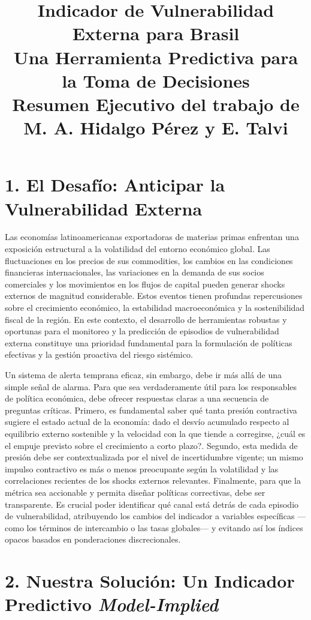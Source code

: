 \documentclass[11pt,a4paper]{article}
\title{
    \vspace{1cm}
    \LARGE{\textbf{Indicador de Vulnerabilidad Externa para Brasil}} \\
    \large{Una Herramienta Predictiva para la Toma de Decisiones} \\
    \vspace{0.5cm}
    \normalsize{Resumen Ejecutivo del trabajo de M. A. Hidalgo Pérez y E. Talvi}
}
\begin{document}
\section*{1. El Desafío: Anticipar la Vulnerabilidad Externa}

Las economías latinoamericanas exportadoras de materias primas enfrentan una exposición estructural a la volatilidad del entorno económico global. Las fluctuaciones en los precios de sus commodities, los cambios en las condiciones financieras internacionales, las variaciones en la demanda de sus socios comerciales y los movimientos en los flujos de capital pueden generar shocks externos de magnitud considerable. Estos eventos tienen profundas repercusiones sobre el crecimiento económico, la estabilidad macroeconómica y la sostenibilidad fiscal de la región. En este contexto, el desarrollo de herramientas robustas y oportunas para el monitoreo y la predicción de episodios de vulnerabilidad externa constituye una prioridad fundamental para la formulación de políticas efectivas y la gestión proactiva del riesgo sistémico.

Un sistema de alerta temprana eficaz, sin embargo, debe ir más allá de una simple señal de alarma. Para que sea verdaderamente útil para los responsables de política económica, debe ofrecer respuestas claras a una secuencia de preguntas críticas. Primero, es fundamental saber qué tanta presión contractiva sugiere el estado actual de la economía: dado el desvío acumulado respecto al equilibrio externo sostenible y la velocidad con la que tiende a corregirse, ¿cuál es el empuje previsto sobre el crecimiento a corto plazo?. Segundo, esta medida de presión debe ser contextualizada por el nivel de incertidumbre vigente; un mismo impulso contractivo es más o menos preocupante según la volatilidad y las correlaciones recientes de los shocks externos relevantes. Finalmente, para que la métrica sea accionable y permita diseñar políticas correctivas, debe ser transparente. Es crucial poder identificar qué canal está detrás de cada episodio de vulnerabilidad, atribuyendo los cambios del indicador a variables específicas —como los términos de intercambio o las tasas globales— y evitando así los índices opacos basados en ponderaciones discrecionales.


\section*{2. Nuestra Solución: Un Indicador Predictivo \emph{Model-Implied}}
\end{document}

